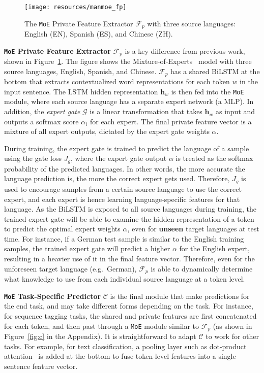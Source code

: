\documentclass[11pt,a4paper]{article}
\def\vh{{\bm{h}}}
\def\gC{{\mathcal{C}}}
\def\gF{{\mathcal{F}}}
\def\gG{{\mathcal{G}}}
\newcommand{\moe}{\texttt{MoE}}
\begin{document}
\begin{figure}
    \centering
    \hspace{-3mm}\texttt{[image: resources/manmoe\_fp]}
    \caption{The \moe{} Private Feature Extractor $\gF_p$ with three source languages: English (EN), Spanish (ES), and Chinese (ZH).}
    \label{fig:fp}
\vspace{-3mm}
\end{figure} 
\noindent\textbf{\moe{} Private Feature Extractor} $\gF_p$ is a key difference from previous work, shown in Figure~\ref{fig:fp}.
The figure shows the Mixture-of-Experts~\citep{shazeer2017moe} model with three source languages, English, Spanish, and Chinese.
$\gF_p$ has a shared BiLSTM at the bottom that extracts contextualized word representations for each token $w$ in the input sentence.
The LSTM hidden representation $\vh_w$ is then fed into the \moe{} module, where each source language has a separate expert network (a MLP).
In addition, the \emph{expert gate} $\gG$ is a linear transformation that takes $\vh_w$ as input and outputs a softmax score $\alpha_i$ for each expert.
The final private feature vector is a mixture of all expert outputs, dictated by the expert gate weights $\alpha$.

During training, the expert gate is trained to predict the language of a sample using the gate loss $J_g$, where the expert gate output $\alpha$ is treated as the softmax probability of the predicted languages.
In other words, the more accurate the language prediction is, the more the correct expert gets used.
Therefore, $J_g$ is used to encourage samples from a certain source language to use the correct expert, and each expert is hence learning language-specific features for that language.
As the BiLSTM is exposed to all source languages during training, the trained expert gate will be able to examine the hidden representation of a token to predict the optimal expert weights $\alpha$, even for \textbf{unseen} target languages at test time.
For instance, if a German test sample is similar to the English training samples, the trained expert gate will predict a higher $\alpha$ for the English expert, resulting in a heavier use of it in the final feature vector.
Therefore, even for the unforeseen target language (e.g.\ German), $\gF_p$ is able to dynamically determine what knowledge to use from each individual source language at a token level.

\noindent\textbf{\moe{} Task-Specific Predictor}
$\gC$ is the final module that make predictions for the end task, and may take different forms depending on the task.
For instance, for sequence tagging tasks, the shared and private features are first concatenated for each token, and then past through a \moe{} module similar to $\gF_p$ (as shown in Figure~\ref{fig:c} in the Appendix).
It is straightforward to adapt $\gC$ to work for other tasks.
For example, for text classification, a pooling layer such as dot-product attention~\citep{D15-1166} is added at the bottom to fuse token-level features into a single sentence feature vector.
\end{document}
